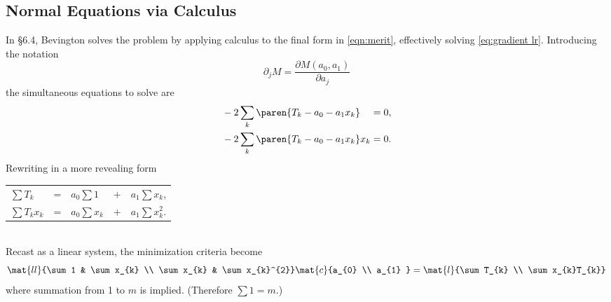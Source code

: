 \subsection{\label{ssec:Normal Equations via Calculus}Normal Equations via Calculus}  %
In \S 6.4, Bevington solves the problem by applying calculus to the final form in \eqref{eqn:merit}, effectively solving \eqref{eq:gradient lr}. Introducing the notation
  \begin{equation*}   %
       \partial_{j} M = \frac{\partial M(a_{0}, a_{1})}{\partial a_{j}}
  \end{equation*}
the simultaneous equations to solve are
\begin{equation*}
  \begin{split}
    &-2 \sum_{k} \paren{T_{k} - a_{0} - a_{1}x_{k}} \phantom{x_{k}} = 0, \\
    &-2 \sum_{k} \paren{T_{k} - a_{0} - a_{1}x_{k}} x_{k}  = 0.
  \end{split}
\end{equation*}
Rewriting in a more revealing form \\
  \begin{table}[h!]  %
    \begin{center}
      \begin{tabular}{lclcl}
         $\sum T_{k}$     & = & $a_{0} \sum 1$     & $ + $ & $a_{1} \sum x_{k}$, \\
         $\sum T_{k} x_{k}$ & = & $a_{0} \sum x_{k}$ & $ + $ & $a_{1} \sum x_{k}^{2}$. \\
      \end{tabular}
    \end{center}
  \end{table} \\
Recast as a linear system, the minimization criteria become
  \begin{equation}   %
      \mat{ll}{\sum 1 & \sum x_{k} \\ \sum x_{k} & \sum x_{k}^{2}}
      \mat{c}{a_{0} \\ a_{1} } = 
      \mat{l}{\sum T_{k} \\ \sum x_{k}T_{k}}
    \label{eq:modal matrix eq}
  \end{equation}
where summation from 1 to $m$ is implied. (Therefore $\sum 1 = m$.)


